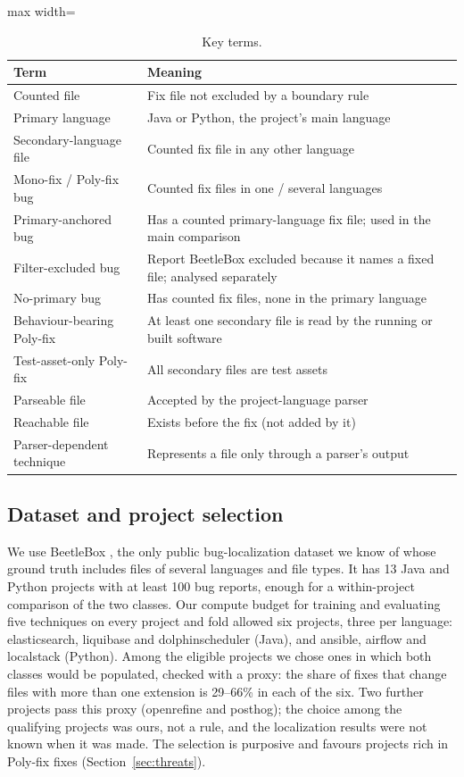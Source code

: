 \documentclass[a4paper,fleqn]{cas-dc}
\begin{document}
\begin{table}[t]
\caption{Key terms.}
\label{tab:terms}
\footnotesize
\begin{adjustbox}{max width=\linewidth}\begin{tabular}{p{3.0cm}p{5.0cm}}
\toprule
Term & Meaning \\
\midrule
Counted file & Fix file not excluded by a boundary rule \\
Primary language & Java or Python, the project's main language \\
Secondary-language file & Counted fix file in any other language \\
Mono-fix / Poly-fix bug & Counted fix files in one / several languages \\
Primary-anchored bug & Has a counted primary-language fix file; used in the main comparison \\
Filter-excluded bug & Report BeetleBox excluded because it names a fixed file; analysed separately \\
No-primary bug & Has counted fix files, none in the primary language \\
Behaviour-bearing Poly-fix & At least one secondary file is read by the running or built software \\
Test-asset-only Poly-fix & All secondary files are test assets \\
Parseable file & Accepted by the project-language parser \\
Reachable file & Exists before the fix (not added by it) \\
Parser-dependent technique & Represents a file only through a parser's output \\
\bottomrule
\end{tabular}\end{adjustbox}
\end{table}

\subsection{Dataset and project selection}\label{sec:dataset}

We use BeetleBox \citep{chakraborty2025blaze}, the only public
bug-localization dataset we know of whose ground truth includes files of
several languages and file types. It has 13 Java and Python projects with at
least 100 bug reports, enough for a within-project comparison of the two
classes. Our compute budget for training and evaluating five techniques on
every project and fold allowed six projects, three per language:
elasticsearch, liquibase and dolphinscheduler (Java), and ansible, airflow and
localstack (Python). Among the eligible projects we chose ones in which
both classes would be populated, checked with a proxy: the share of fixes that
change files with more than one extension is 29--66\% in each of the six. Two
further projects pass this proxy (openrefine and posthog); the choice among
the qualifying projects was ours, not a rule, and the localization results
were not known when it was made. The selection is purposive and favours
projects rich in Poly-fix fixes (Section~\ref{sec:threats}).
\end{document}
